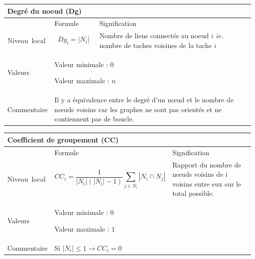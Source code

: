 \documentclass{article}
\begin{document}
\begin{table}[H]
\raggedright
\begin{tabular}{|m{3.24cm}|m{4.4810004cm}m{7.924cm}|}

\hline
\multicolumn{3}{|m{16.044998cm}|}{Degré du noeud (Dg)}\\\hline
 &
\multicolumn{1}{m{4.4810004cm}|}{Formule} &
Signification\\\hline
Niveau~local 

 &
\multicolumn{1}{m{4.4810004cm}|}{\begin{equation*}
{\mathit{Dg}}_{i}=\left|{N}_{i}\right|
\end{equation*}
} & 
Nombre de liens connectés au noeud $i$ \textit{ie.} nombre de taches voisines de la tache $i$\\\hline
Valeurs &
\multicolumn{2}{m{12.6050005cm}|}{Valeur minimale : 0

Valeur maximale :  $n$

}\\\hline
Commentaire &
\multicolumn{2}{m{12.6050005cm}|}{Il y a équivalence entre le degré d’un nœud et le nombre de nœuds voisins car les graphes ne sont pas orientés et ne contiennent pas de boucle.

}\\\hline
\end{tabular}
\end{table}
\begin{table}[H]
\raggedright
\begin{tabular}{|m{3.24cm}|m{5.303cm}m{7.103cm}|}

\hline
\multicolumn{3}{|m{16.046cm}|}{Coefficient de groupement (CC)}\\\hline
 &
\multicolumn{1}{m{5.303cm}|}{Formule} &
Signification\\\hline
Niveau~local 

 &
\multicolumn{1}{m{5.303cm}|}{\begin{equation*}
{\mathit{CC}}_{i}=\frac{1}{\left|{N}_{i}\right|\left(\left|{N}_{i}\right|-1\right)}\sum _{j{\in}{N}_{i}}{\left|{N}_{i}{\cap}{N}_{j}\right|}
\end{equation*}
} &
Rapport du nombre de nœuds voisins de i voisins entre eux sur le total possible.\\\hline
Valeurs &
\multicolumn{2}{m{12.606cm}|}{Valeur minimale : 0

Valeur maximale : 1}\\\hline
Commentaire &
\multicolumn{2}{m{12.606cm}|}{Si  $\left|{N}_{i}\right|{\leq}1\rightarrow {\mathit{CC}}_{i}=0$ }\\\hline
\end{tabular}
\end{table}
\end{document}
